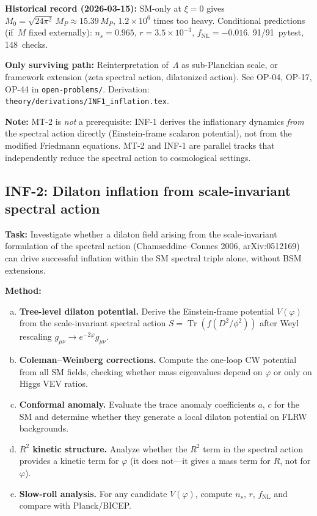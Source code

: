\documentclass[12pt,a4paper]{article}
\newcommand{\task}[1]{\noindent\textbf{Task:} #1\par}
\newcommand{\method}[1]{\noindent\textbf{Method:} #1\par}
\begin{document}
\textbf{Historical record (2026-03-15):} SM-only at $\xi = 0$ gives
$M_0 = \sqrt{24\pi^2}\,M_P \approx 15.39\,M_P$, $1.2 \times 10^6$
times too heavy.  Conditional predictions (if~$M$ fixed externally):
$n_s = 0.965$, $r = 3.5 \times 10^{-3}$, $f_{\text{NL}} = -0.016$.
91/91~pytest, 148~checks.

\textbf{Only surviving path:} Reinterpretation of~$\Lambda$ as
sub-Planckian scale, or framework extension (zeta spectral action,
dilatonized action).  See OP-04, OP-17, OP-44 in \texttt{open-problems/}.
Derivation: \texttt{theory/derivations/INF1\_inflation.tex}.

\textbf{Note:} MT-2 is \emph{not} a prerequisite: INF-1 derives the inflationary
dynamics \emph{from} the spectral action directly (Einstein-frame scalaron potential),
not from the modified Friedmann equations. MT-2 and INF-1 are parallel tracks that
independently reduce the spectral action to cosmological settings.

\subsection{INF-2: Dilaton inflation from scale-invariant spectral action}
\label{task:INF2}

\task{Investigate whether a dilaton field arising from the scale-invariant
formulation of the spectral action (Chamseddine--Connes 2006,
arXiv:0512169) can drive successful inflation within the SM spectral triple
alone, without BSM extensions.}

\method{
\begin{enumerate}[(a)]
  \item \textbf{Tree-level dilaton potential.} Derive the Einstein-frame
    potential $V(\varphi)$ from the scale-invariant spectral action
    $S = \operatorname{Tr}(f(D^2/\phi^2))$ after Weyl rescaling
    $g_{\mu\nu} \to e^{-2\varphi} g_{\mu\nu}$.
  \item \textbf{Coleman--Weinberg corrections.} Compute the one-loop
    CW potential from all SM fields, checking whether mass eigenvalues
    depend on $\varphi$ or only on Higgs VEV ratios.
  \item \textbf{Conformal anomaly.} Evaluate the trace anomaly coefficients
    $a$, $c$ for the SM and determine whether they generate a local
    dilaton potential on FLRW backgrounds.
  \item \textbf{$R^2$ kinetic structure.} Analyze whether the $R^2$ term
    in the spectral action provides a kinetic term for $\varphi$
    (it does not---it gives a mass term for $R$, not for $\varphi$).
  \item \textbf{Slow-roll analysis.} For any candidate $V(\varphi)$,
    compute $n_s$, $r$, $f_{\text{NL}}$ and compare with Planck/BICEP.
\end{enumerate}
}
\end{document}
